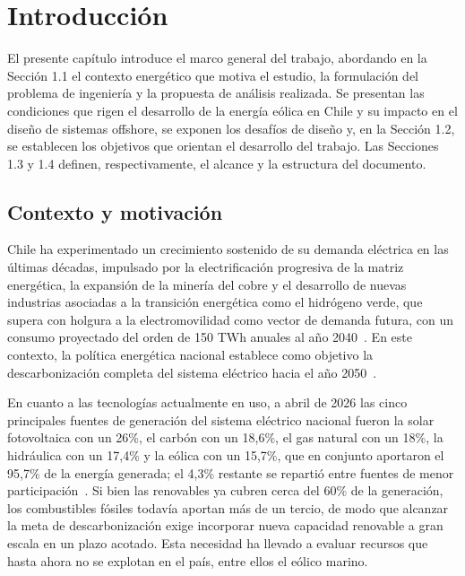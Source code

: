 \chapter{Introducción}

El presente capítulo introduce el marco general del trabajo, abordando en la Sección 1.1 el contexto energético que motiva el estudio, la formulación del problema de ingeniería y la propuesta de análisis realizada. Se presentan las condiciones que rigen el desarrollo de la energía eólica en Chile y su impacto en el diseño de sistemas offshore, se exponen los desafíos de diseño y, en la Sección 1.2, se establecen los objetivos que orientan el desarrollo del trabajo. Las Secciones 1.3 y 1.4 definen, respectivamente, el alcance y la estructura del documento.

\section{Contexto y motivación}

Chile ha experimentado un crecimiento sostenido de su demanda eléctrica en las últimas décadas, impulsado por la electrificación progresiva de la matriz energética, la expansión de la minería del cobre y el desarrollo de nuevas industrias asociadas a la transición energética como el hidrógeno verde, que supera con holgura a la electromovilidad como vector de demanda futura, con un consumo proyectado del orden de 150 TWh anuales al año 2040~\parencite{CEN_Proyeccion2045}. En este contexto, la política energética nacional establece como objetivo la descarbonización completa del sistema eléctrico hacia el año 2050~\parencite{MinEnergia2022}.

En cuanto a las tecnologías actualmente en uso, a abril de 2026 las cinco principales fuentes de generación del sistema eléctrico nacional fueron la solar fotovoltaica con un 26\%, el carbón con un 18{,}6\%, el gas natural con un 18\%, la hidráulica con un 17{,}4\% y la eólica con un 15{,}7\%, que en conjunto aportaron el 95{,}7\% de la energía generada; el 4{,}3\% restante se repartió entre fuentes de menor participación~\parencite{CEN_May2026}. Si bien las renovables ya cubren cerca del 60\% de la generación, los combustibles fósiles todavía aportan más de un tercio, de modo que alcanzar la meta de descarbonización exige incorporar nueva capacidad renovable a gran escala en un plazo acotado. Esta necesidad ha llevado a evaluar recursos que hasta ahora no se explotan en el país, entre ellos el eólico marino.


